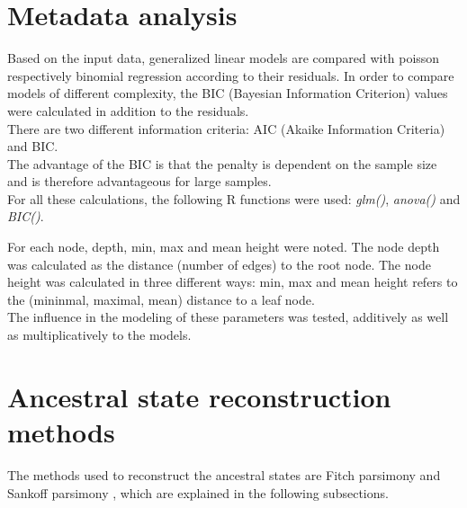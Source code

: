   \section{Metadata analysis} \label{sec:methods - metadata analysis}
    Based on the input data, generalized linear models are compared with poisson respectively binomial 
      regression according to their residuals. In order to compare models of different complexity, the 
      BIC (Bayesian Information Criterion) values were calculated in addition to the residuals. \\
    There are two different information criteria: AIC (Akaike Information Criteria) and BIC. \\
    The advantage of the BIC is that the penalty is dependent on the sample size and is therefore 
      advantageous for large samples. \\
    For all these calculations, the following R functions were used: \textit{glm()}, \textit{anova()} 
      and \textit{BIC()}.

    For each node, depth, min, max and mean height were noted. The node depth was calculated as the
      distance (number of edges) to the root node. The node height was calculated in three different 
      ways: min, max and mean height refers to the (mininmal, maximal, mean) distance to a leaf node. \\
    The influence in the modeling of these parameters was tested, additively as well as 
      multiplicatively to the models.

  \section{Ancestral state reconstruction methods} \label{sec:methods - ancestral state reconstruction}
    The methods used to reconstruct the ancestral states are Fitch parsimony \cite{Fitch1971} and 
      Sankoff parsimony \cite{Sankoff1975}, which are explained in the following subsections.

